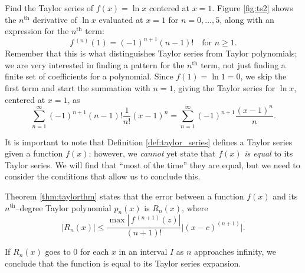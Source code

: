 {Find the Taylor series of $f(x) = \ln x$ centered at $x=1$.}
{Figure \ref{fig:ts2} shows the $n^\text{th}$ derivative of $\ln x$ evaluated at $x=1$ for $n=0,\ldots,5$, along with an expression for the $n^\text{th}$ term: $$f\,^{(n)}(1) = (-1)^{n+1}(n-1)!\quad \text{for $n\geq 1$.}$$ Remember that this is what distinguishes Taylor series from Taylor polynomials; we are very interested in finding a pattern for the $n^\text{th}$ term, not just finding a finite set of coefficients for a polynomial.
Since $f(1) = \ln 1 = 0$, we skip the first term and start the summation with $n=1$, giving the Taylor series for $\ln x$, centered at $x=1$, as 
$$\sum_{n=1}^\infty (-1)^{n+1}(n-1)!\frac{1}{n!}(x-1)^n = \sum_{n=1}^\infty (-1)^{n+1}\frac{(x-1)^n}{n}. $$}

It is important to note that Definition \ref{def:taylor_series} defines a Taylor series given a function $f(x)$; however, we \emph{cannot} yet state that $f(x)$ \emph{is equal} to its Taylor series. We will find that ``most of the time'' they are equal, but we need to consider the conditions that allow us to conclude this.

Theorem \ref{thm:taylorthm} states that the error between a function $f(x)$ and its $n^\text{th}$--degree Taylor polynomial $p_n(x)$ is $R_n(x)$, where
$$ \big|R_n(x)\big| \leq \frac{\max\left|\,f\,^{(n+1)}(z)\right|}{(n+1)!}\big|(x-c)^{(n+1)}\big|.$$

If $R_n(x)$ goes to 0 for each $x$ in an interval $I$ as $n$ approaches infinity, we conclude that the function is equal to its Taylor series expansion.

